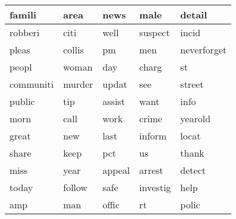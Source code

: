 \begin{longtable}{p{2.5cm}p{2.5cm}p{2.5cm}p{2.5cm}p{2.5cm}}
famili&area&news&male&detail\\ \hline 
robberi&citi&well&suspect&incid\\ \hline 
pleas&collis&pm&men&neverforget\\ \hline 
peopl&woman&day&charg&st\\ \hline 
communiti&murder&updat&see&street\\ \hline 
public&tip&assist&want&info\\ \hline 
morn&call&work&crime&yearold\\ \hline 
great&new&last&inform&locat\\ \hline 
share&keep&pct&us&thank\\ \hline 
miss&year&appeal&arrest&detect\\ \hline 
today&follow&safe&investig&help\\ \hline 
amp&man&offic&rt&polic\\ \hline 
\end{longtable}
